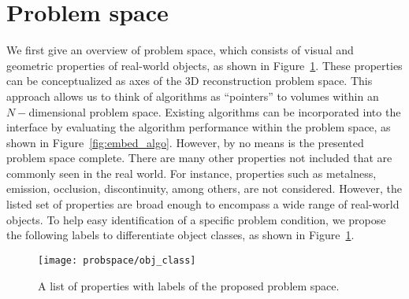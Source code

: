 \section{Problem space}
\label{sec:prob_space}
We first give an overview of problem space, which consists of visual and geometric properties of real-world objects, as shown in Figure~\ref{fig:obj_class}. These properties can be conceptualized as axes of the 3D reconstruction problem space. This approach allows us to think of algorithms as ``pointers'' to volumes within an $N-$dimensional problem space. Existing algorithms can be incorporated into the interface by evaluating the algorithm performance within the problem space, as shown in Figure~\ref{fig:embed_algo}. However, by no means is the presented problem space complete. There are many other properties not included that are commonly seen in the real world. For instance, properties such as metalness, emission, occlusion, discontinuity, among others, are not considered. However, the listed set of properties are broad enough to encompass a wide range of real-world objects. To help easy identification of a specific problem condition, we propose the following labels to differentiate object classes, as shown in Figure~\ref{fig:obj_class}.
\begin{figure}[!htbp]
\centering
\texttt{[image: probspace/obj\_class]}\\
\caption{A list of properties with labels of the proposed problem space.}
\label{fig:obj_class}
\end{figure}

